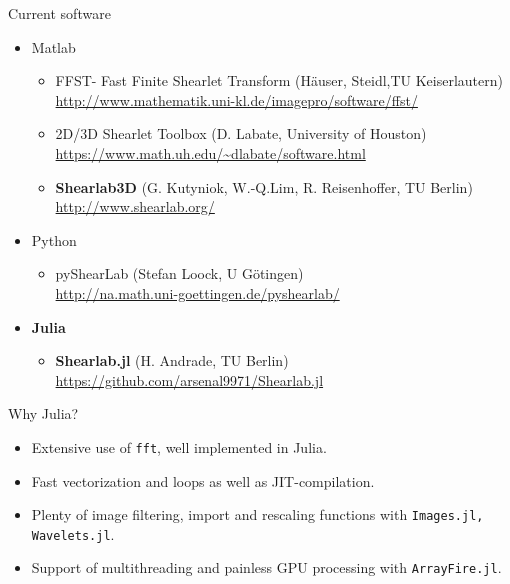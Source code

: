\begin{frame}{Current software}
\begin{itemize}
\item{Matlab}
\begin{itemize}
	\item FFST- Fast Finite Shearlet Transform (H\"auser, Steidl,TU Keiserlautern)\\ \url{http://www.mathematik.uni-kl.de/imagepro/software/ffst/}
	\item 2D/3D Shearlet Toolbox (D. Labate, University of Houston)\\ \url{https://www.math.uh.edu/~dlabate/software.html}
	\item \textbf{Shearlab3D} (G. Kutyniok, W.-Q.Lim, R. Reisenhoffer, TU Berlin)\\\url{http://www.shearlab.org/}
\end{itemize}
\pause
\item{Python}
\begin{itemize}
	\item pyShearLab (Stefan Loock, U G\"otingen) \\ \url{http://na.math.uni-goettingen.de/pyshearlab/}
\end{itemize}
\pause
\item{\textbf{Julia}}
\begin{itemize}
\item \textbf{Shearlab.jl} (H. Andrade, TU Berlin) \\ \url{https://github.com/arsenal9971/Shearlab.jl}
\end{itemize}
\end{itemize}
\end{frame}

\begin{frame}{Why Julia?}
\begin{itemize}
\item Extensive use of \lstinline[language=julia]{fft}, well implemented in Julia.

\bigskip
\pause

\item Fast vectorization and loops as well as JIT-compilation.

\bigskip
\pause
\item Plenty of image filtering, import and rescaling functions with  \lstinline[language=julia]{Images.jl, Wavelets.jl}.

\bigskip
\pause
\item Support of multithreading and painless GPU processing with  \lstinline[language=julia]{ArrayFire.jl}.
\end{itemize}
\end{frame}


